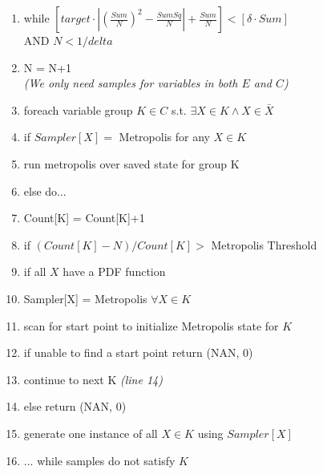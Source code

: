 \begin{figure}
\begin{algorithm}
\begin{enumerate}
\item \hspace*{0.1in} while $\left[target \cdot \left|(\frac{Sum}{N})^2 - \frac{SumSq}{N}\right| + \frac{Sum}{N}\right] < \left[\delta \cdot Sum\right]$  \\\hspace*{0.4in} AND $N < 1/delta$
\item \hspace*{0.2in} N = N+1
\\    \hspace*{0.2in} \textit{(We only need samples for variables in both $E$ and $C$)}
\item \hspace*{0.2in} foreach variable group $K \in C$ s.t. $\exists X \in K \wedge X \in \bar X$
\item \hspace*{0.3in} if $Sampler[X] =$ Metropolis for any $X \in K$
\item \hspace*{0.4in} run metropolis over saved state for group K
\item \hspace*{0.3in} else do...
\item \hspace*{0.4in} Count[K] = Count[K]+1
\item \hspace*{0.4in} if $(Count[K]-N)/Count[K] >$ Metropolis Threshold
\item \hspace*{0.5in} if all $X$ have a PDF function
\item \hspace*{0.6in} Sampler[X] = Metropolis $\forall X \in K$
\item \hspace*{0.6in} scan for start point to initialize Metropolis state for $K$ 
\item \hspace*{0.6in} if unable to find a start point return (NAN, 0)
\item \hspace*{0.6in} continue to next K \textit{(line 14)}
\item \hspace*{0.5in} else return (NAN, 0)
\item \hspace*{0.4in} generate one instance of all $X \in K$ using $Sampler[X]$
\item \hspace*{0.3in} ... while samples do not satisfy $K$

\end{enumerate}
\end{algorithm}
\end{figure}
